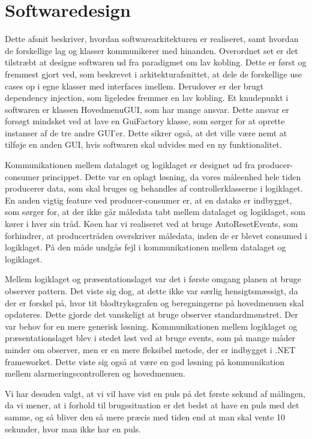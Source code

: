 \section{Softwaredesign}
Dette afsnit beskriver, hvordan softwarearkitekturen er realiseret, samt hvordan de forskellige lag og klasser kommunikerer med hinanden. Overordnet set er det tilstræbt at designe softwaren ud fra paradigmet om lav kobling. Dette er først og fremmest gjort ved, som beskrevet i arkitekturafsnittet, at dele de forskellige use cases op i egne klasser med interfaces imellem. Derudover er der brugt dependency injection, som ligeledes fremmer en lav kobling. Et knudepunkt i softwaren er klassen HovedmenuGUI, som har mange ansvar. Dette ansvar er forsøgt mindsket ved at lave en GuiFactory klasse, som sørger for at oprette instanser af de tre andre GUI'er. Dette sikrer også, at det ville være nemt at tilføje en anden GUI, hvis softwaren skal udvides med en ny funktionalitet. 

Kommunikationen mellem datalaget og logiklaget er designet ud fra producer-consumer princippet. Dette var en oplagt løsning, da vores måleenhed hele tiden producerer data, som skal bruges og behandles af controllerklasserne i logiklaget. En anden vigtig feature ved producer-consumer er, at en datakø er indbygget, som sørger for, at der ikke går måledata tabt mellem datalaget og logiklaget, som kører i hver sin tråd. Køen har vi realiseret ved at bruge AutoResetEvents, som forhindrer, at producertråden overskriver måledata, inden de er blevet consumed i logiklaget. På den måde undgås fejl i kommunikationen mellem datalaget og logiklaget. 

Mellem logiklaget og præsentationslaget var det i første omgang planen at bruge observer pattern. Det viste sig dog, at dette ikke var særlig hensigtsmæssigt, da der er forskel på, hvor tit blodtryksgrafen og beregningerne på hovedmenuen skal opdateres. Dette gjorde det vanskeligt at bruge observer standardmønstret. Der var behov for en mere generisk løsning. Kommunikationen mellem logiklaget og præsentationslaget blev i stedet løst ved at bruge events, som på mange måder minder om observer, men er en mere fleksibel metode, der er indbygget i .NET frameworket. Dette viste sig også at være en god løsning på kommunikation mellem alarmeringscontrolleren og hovedmenuen. 

Vi har desuden valgt, at vi vil have vist en puls på det første sekund af målingen, da vi mener, at i forhold til brugssituation er det bedst at have en puls med det samme, og så bliver den så mere præcis med tiden end at man skal vente 10 sekunder, hvor man ikke har en puls. 

